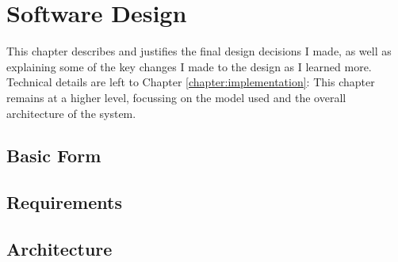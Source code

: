 \chapter{Software Design}
\label{chapter:design}
  This chapter describes and justifies the final design decisions I made, as well as explaining some of the key changes I made to the design as I learned more. Technical details are left to Chapter \ref{chapter:implementation}: This chapter remains at a higher level, focussing on the model used and the overall architecture of the system.

  \section{Basic Form}
  \section{Requirements}
    \todo{\item}

  \section{Architecture}
